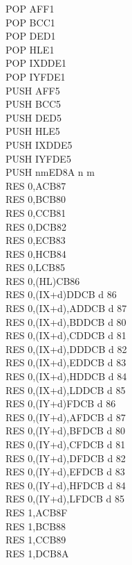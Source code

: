 \begin{multicols}{3}
{\begin{tabbing}
		POP AF\>F1\\
		POP BC\>C1\\
		POP DE\>D1\\
		POP HL\>E1\\
		POP IX\>DDE1\\
		POP IY\>FDE1\\
		PUSH AF\>F5\\
		PUSH BC\>C5\\
		PUSH DE\>D5\\
		PUSH HL\>E5\\
		PUSH IX\>DDE5\\
		PUSH IY\>FDE5\\
		PUSH nm\ZXN\>ED8A n m\\
		RES 0,A\>CB87\\
		RES 0,B\>CB80\\
		RES 0,C\>CB81\\
		RES 0,D\>CB82\\
		RES 0,E\>CB83\\
		RES 0,H\>CB84\\
		RES 0,L\>CB85\\
		RES 0,(HL)\>CB86\\
		RES 0,(IX+d)\>DDCB d 86\\
		RES 0,(IX+d),A\UNDOC\>DDCB d 87\\
		RES 0,(IX+d),B\UNDOC\>DDCB d 80\\
		RES 0,(IX+d),C\UNDOC\>DDCB d 81\\
		RES 0,(IX+d),D\UNDOC\>DDCB d 82\\
		RES 0,(IX+d),E\UNDOC\>DDCB d 83\\
		RES 0,(IX+d),H\UNDOC\>DDCB d 84\\
		RES 0,(IX+d),L\UNDOC\>DDCB d 85\\
		RES 0,(IY+d)\>FDCB d 86\\
		RES 0,(IY+d),A\UNDOC\>FDCB d 87\\
		RES 0,(IY+d),B\UNDOC\>FDCB d 80\\
		RES 0,(IY+d),C\UNDOC\>FDCB d 81\\
		RES 0,(IY+d),D\UNDOC\>FDCB d 82\\
		RES 0,(IY+d),E\UNDOC\>FDCB d 83\\
		RES 0,(IY+d),H\UNDOC\>FDCB d 84\\
		RES 0,(IY+d),L\UNDOC\>FDCB d 85\\
		RES 1,A\>CB8F\\
		RES 1,B\>CB88\\
		RES 1,C\>CB89\\
		RES 1,D\>CB8A\\

\end{tabbing}}
\end{multicols}
